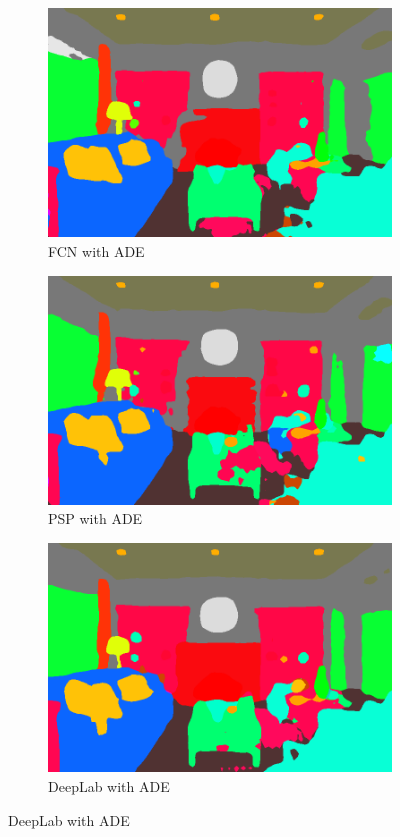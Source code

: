 \documentclass[12pt,a4paper]{report}
\newcommand{\acronym}{\MakeUppercase}
\begin{document}
\begin{figure}[h!]
\begin{subfigure}[b]{0.3\textwidth}
			\includegraphics[width=\textwidth]{in_ade_fcn}
			\caption{\acronym{fcn} with \acronym{ade}}
		\end{subfigure}
		\begin{subfigure}[b]{0.3\textwidth}
			\includegraphics[width=\textwidth]{in_ade_psp}
			\caption{\acronym{psp} with \acronym{ade}}
		\end{subfigure}
		\begin{subfigure}[b]{0.3\textwidth}
			\includegraphics[width=\textwidth]{in_ade_deep}
			\caption{DeepLab with \acronym{ade}}
		\end{subfigure}
		\label{fig:in}
	\end{figure}
	
\end{document}
